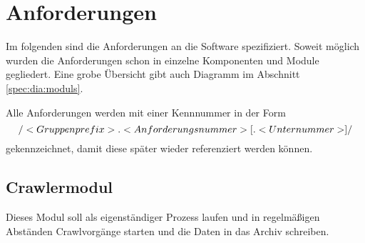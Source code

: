 \chapter{Anforderungen}
Im folgenden sind die Anforderungen an die Software spezifiziert. Soweit möglich wurden
die Anforderungen schon in einzelne Komponenten und Module gegliedert. Eine grobe Übersicht gibt auch Diagramm
im Abschnitt \ref{spec:dia:moduls}.

Alle Anforderungen werden mit einer Kennnummer in der Form 
\[ \text{/}<Gruppenprefix> . <Anforderungsnummer> [. <Unternummer> ]\text{/} \]
gekennzeichnet, damit diese später wieder referenziert werden können.

\section{Crawlermodul}
Dieses Modul soll als eigenständiger Prozess laufen und in regelmäßigen Abständen Crawlvorgänge starten
und die Daten in das Archiv schreiben.

